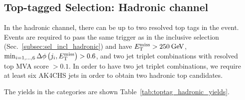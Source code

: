 \subsection{Top-tagged Selection: Hadronic channel}
\label{subsec:sel_toptag_hadronic}

In the hadronic channel, there can be up to two resolved \iffalse boosted \fi top tags in the event. \iffalse This naturally leads to definitions for three signal region categories: two top tags, one top tags, and zero top tags. \fi Events are required to pass the same trigger as in the inclusive selection (Sec.~\ref{subsec:sel_incl_hadronic}) and have $E_\mathrm{T}^{\mathrm{miss}}>250\:\mathrm{Ge\kern -0.1em V}$,  $\min_{i=1,\ldots,6}\Delta\phi\left(j_i,E_\mathrm{T}^{\mathrm{miss}}\right)>0.6$, and two jet triplet combinations with resolved top MVA score $> 0.1$. In order to have two jet triplet combinations, we require at least six AK4CHS jets in order to obtain two hadronic top candidates.

\iffalse To ensure the categories are exclusive, the selections are applied in the order listed above and once the event satisfies the requirments of a particular category, it is no longer considered for subsequent categories.\fi The yields in the categories are shown Table~\ref{tab:toptag_hadronic_yields}.

